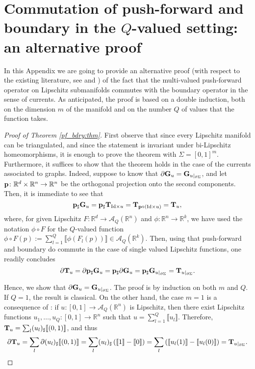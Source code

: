 \documentclass[a4paper,11pt,reqno]{amsart}
\theoremstyle{definition}
\numberwithin{equation}{section}
\numberwithin{subsection}{section}
\newcommand{\R}{\mathbb{R}}
\newcommand{\A}{\mathcal{A}}
\begin{document}
\appendix

\section{Commutation of push-forward and boundary in the $Q$-valued setting: an alternative proof} \label{sec:commutation}

In this Appendix we are going to provide an alternative proof (with respect to the existing literature, see \cite{Almgren00} and \cite{DLS13a}) of the fact that the multi-valued push-forward operator on Lipschitz submanifolds commutes with the boundary operator in the sense of currents. As anticipated, the proof is based on a double induction, both on the dimension $m$ of the manifold and on the number $Q$ of values that the function takes.

\begin{proof}[Proof of Theorem \ref{pf_bdry:thm}]
First observe that since every Lipschitz manifold can be triangulated, and since the statement is invariant under bi-Lipschitz homeomorphisms, it is enough to prove the theorem with $\Sigma = \left[ 0,1 \right]^{m}$. Furthermore, it suffices to show that the theorem holds in the case of the currents associated to graphs. Indeed, suppose to know that $\partial {\bf G}_{u} = {\bf G}_{u|_{\partial \Sigma}}$, and let ${\bf p} \colon \R^{d} \times \R^{n} \to \R^{n}$ be the orthogonal projection onto the second components. Then, it is immediate to see that
\[
{\bf p}_{\sharp} {\bf G}_{u} = {\bf p}_{\sharp} {\bf T}_{{\rm Id} \times u} = {\bf T}_{{\bf p} \circ ({\rm Id} \times u)} = {\bf T}_{u},
\]
where, for given Lipschitz $F \colon \R^{d} \to \A_{Q}(\R^{n})$ and $\phi \colon \R^{n} \to \R^{k}$, we have used the notation $\phi \circ F$ for the $Q$-valued function $\phi \circ F(p) := \sum_{l=1}^{Q} \llbracket \phi(F_{l}(p)) \rrbracket \in \A_{Q}(\R^{k})$. Then, using that push-forward and boundary do commute in the case of single valued Lipschitz functions, one readily concludes
\[
\partial {\bf T}_{u} = \partial {\bf p}_{\sharp} {\bf G}_{u} = {\bf p}_{\sharp} \partial {\bf G}_{u} = {\bf p}_{\sharp} {\bf G}_{u|_{\partial \Sigma}} = {\bf T}_{u|_{\partial \Sigma}}.
\]

Hence, we show that $\partial {\bf G}_{u} = {\bf G}_{u|_{\partial \Sigma}}$. The proof is by induction on both $m$ and $Q$. If $Q = 1$, the result is classical. On the other hand, the case $m = 1$ is a consequence of \cite[Proposition 1.2]{DLS11a}: if $u \colon \left[ 0,1 \right] \to \A_{Q}(\R^{n})$ is Lipschitz, then there exist Lipschitz functions $u_{1},\dots,u_{Q} \colon \left[ 0,1 \right] \to \R^{n}$ such that $u = \sum_{l=1}^{Q} \llbracket u_{l} \rrbracket$. Therefore, ${\bf T}_{u} = \sum_{l} (u_{l})_{\sharp} \llbracket (0,1) \rrbracket$, and thus
\[
\partial {\bf T}_{u} = \sum_{l} \partial (u_{l})_{\sharp} \llbracket (0,1) \rrbracket = \sum_{l} (u_{l})_{\sharp} \left( \llbracket 1 \rrbracket - \llbracket 0 \rrbracket \right) = \sum_{l} \left( \llbracket u_{l}(1) \rrbracket - \llbracket u_{l}(0) \rrbracket \right) = {\bf T}_{u|_{\partial \Sigma}}.  
\]


\end{proof}
\end{document}
